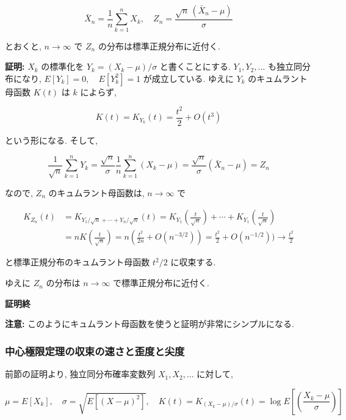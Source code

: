 \documentclass[
  letterpaper,
  DIV=11,
  numbers=noendperiod]{scrartcl}
\begin{document}
\[
\bar{X}_n = \frac{1}{n}\sum_{k=1}^n X_k, \quad
Z_n = \frac{\sqrt{n}\,(\bar{X}_n - \mu)}{\sigma}
\]

とおくと, \(n\to\infty\) で \(Z_n\) の分布は標準正規分布に近付く.

\textbf{証明:} \(X_k\) の標準化を \(Y_k = (X_k - \mu)/\sigma\)
と書くことにする. \(Y_1, Y_2, \ldots\) も独立同分布になり,
\(E[Y_k] = 0, \quad E[Y_k^2] = 1\) が成立している. ゆえに \(Y_k\)
のキュムラント母函数 \(K(t)\) は \(k\) によらず,

\[
K(t) = K_{Y_k}(t) = \frac{t^2}{2} + O(t^3)
\]

という形になる. そして,

\[
\frac{1}{\sqrt{n}}\sum_{k=1}^n Y_k =
\frac{\sqrt{n}}{\sigma}\frac{1}{n}\sum_{k=1}^n (X_k - \mu) =
\frac{\sqrt{n}}{\sigma}(\bar{X}_n - \mu) = Z_n
\]

なので, \(Z_n\) のキュムラント母函数は, \(n\to\infty\) で

\[
\begin{aligned}
K_{Z_n}(t) &=
K_{Y_1/\sqrt{n}+\cdots+Y_n/\sqrt{n}}(t) =
K_{Y_1}\left(\frac{t}{\sqrt{n}}\right) + \cdots + K_{Y_1}\left(\frac{t}{\sqrt{n}}\right) \\ &=
n K\left(\frac{t}{\sqrt{n}}\right) =
n\left(\frac{t^2}{2n} + O(n^{-3/2})\right) =
\frac{t^2}{2} + O(n^{-1/2})) \to
\frac{t^2}{2}
\end{aligned}
\]

と標準正規分布のキュムラント母函数 \(t^2/2\) に収束する.

ゆえに \(Z_n\) の分布は \(n\to\infty\) で標準正規分布に近付く.

\textbf{証明終}

\textbf{注意:}
このようにキュムラント母函数を使うと証明が非常にシンプルになる.

\hypertarget{ux4e2dux5fc3ux6975ux9650ux5b9aux7406ux306eux53ceux675fux306eux901fux3055ux3068ux6b6aux5ea6ux3068ux5c16ux5ea6}{%
\subsubsection{中心極限定理の収束の速さと歪度と尖度}\label{ux4e2dux5fc3ux6975ux9650ux5b9aux7406ux306eux53ceux675fux306eux901fux3055ux3068ux6b6aux5ea6ux3068ux5c16ux5ea6}}

前節の証明より, 独立同分布確率変数列 \(X_1,X_2,\ldots\) に対して,

\[
\mu = E[X_k], \quad
\sigma = \sqrt{E[(X-\mu)^2]}, \quad
K(t) = K_{(X_k - \mu)/\sigma}(t) = \log E\left[\left(\frac{X_k-\mu}{\sigma}\right)\right]
\]
\end{document}
